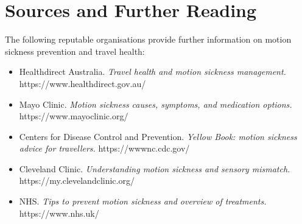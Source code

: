 \section*{Sources and Further Reading}
The following reputable organisations provide further information on motion sickness prevention and travel health:
\begin{itemize}
    \item Healthdirect Australia. \textit{Travel health and motion sickness management.} https://www.healthdirect.gov.au/
    \item Mayo Clinic. \textit{Motion sickness causes, symptoms, and medication options.} https://www.mayoclinic.org/
    \item Centers for Disease Control and Prevention. \textit{Yellow Book: motion sickness advice for travellers.} https://wwwnc.cdc.gov/
    \item Cleveland Clinic. \textit{Understanding motion sickness and sensory mismatch.} https://my.clevelandclinic.org/
    \item NHS. \textit{Tips to prevent motion sickness and overview of treatments.} https://www.nhs.uk/
\end{itemize}
